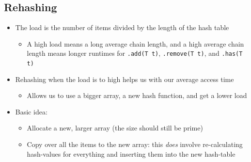 \documentclass[10pt]{article}
\begin{document}
\subsection*{Rehashing}
\begin{itemize}
    \item The load is the number of items divided by the length of the hash table
    \begin{itemize}
        \item A high load means a long average chain length, and a high average chain length means longer runtimes for \texttt{.add(T t)}, \texttt{.remove(T t)}, and \texttt{.has(T t)}
    \end{itemize}
    \item Rehashing when the load is to high helps us with our average access time
    \begin{itemize}
        \item Allows us to use a bigger array, a new hash function, and get a lower load
    \end{itemize}
    \item Basic idea:
    \begin{itemize}
        \item Allocate a new, larger array (the size should still be prime)
        \item Copy over all the items to the new array: this \textit{does} involve re-calculating hash-values for everything and inserting them into the new hash-table
    \end{itemize}
\end{itemize}
\end{document}
